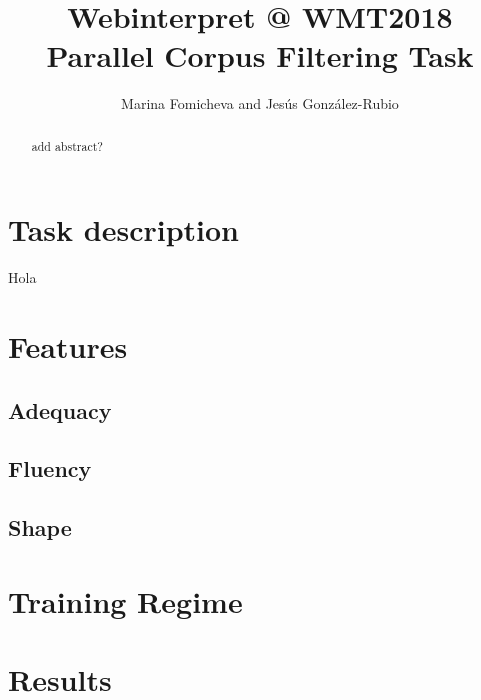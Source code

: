 \documentclass[a0]{sciposter}
\title{Webinterpret @ WMT2018\\Parallel Corpus Filtering Task}
\author{Marina Fomicheva and Jes\'{u}s Gonz\'{a}lez-Rubio}
\institute{AT Language Solutions, Webinterpret}
\begin{document}
\maketitle

\begin{multicols*}{3}


\begin{abstract}
add abstract?
\end{abstract}

\section{Task description}

Hola

\section{Features}

\subsection{Adequacy}

\subsection{Fluency}

\subsection{Shape}

\section{Training Regime}


\section{Results}

\end{multicols*}
\end{document}
